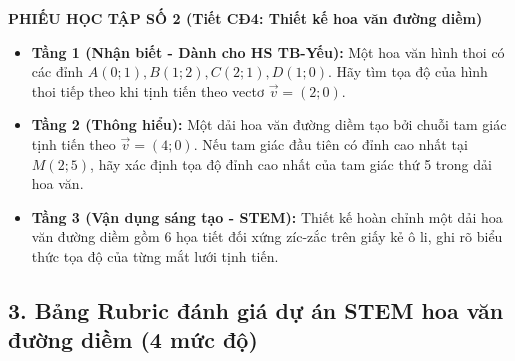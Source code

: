 \documentclass[12pt, a4paper]{article}
\renewcommand{\vec}[1]{\overrightarrow{#1}}
\begin{document}
\vspace{5pt}  
\noindent \textbf{PHIẾU HỌC TẬP SỐ 2 (Tiết CĐ4: Thiết kế hoa văn đường diềm)}  
\begin{itemize}[leftmargin=0.6cm]  
    \item \textbf{Tầng 1 (Nhận biết - Dành cho HS TB-Yếu):}  
    Một hoa văn hình thoi có các đỉnh $A(0; 1), B(1; 2), C(2; 1), D(1; 0)$. Hãy tìm tọa độ của hình thoi tiếp theo khi tịnh tiến theo vectơ $\vec{v} = (2; 0)$.  
    \item \textbf{Tầng 2 (Thông hiểu):}  
    Một dải hoa văn đường diềm tạo bởi chuỗi tam giác tịnh tiến theo $\vec{v} = (4; 0)$. Nếu tam giác đầu tiên có đỉnh cao nhất tại $M(2; 5)$, hãy xác định tọa độ đỉnh cao nhất của tam giác thứ 5 trong dải hoa văn.  
    \item \textbf{Tầng 3 (Vận dụng sáng tạo - STEM):}  
    Thiết kế hoàn chỉnh một dải hoa văn đường diềm gồm 6 họa tiết đối xứng zíc-zắc trên giấy kẻ ô li, ghi rõ biểu thức tọa độ của từng mắt lưới tịnh tiến.  
\end{itemize}  
  
\subsection*{3. Bảng Rubric đánh giá dự án STEM hoa văn đường diềm (4 mức độ)}  
  
\end{document}
